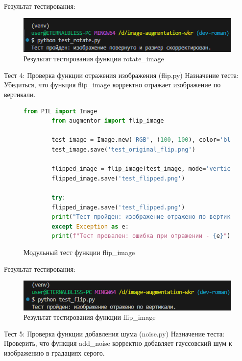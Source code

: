 Результат тестирования:
\begin{figure}[H]
	\centering
	\includegraphics[width=0.7\linewidth]{images/resulttest3}
	\caption{Результат тестирования функции rotate\_image}
	\label{fig:resulttest3}
\end{figure}

Тест 4: Проверка функции отражения изображения (flip.py)
Назначение теста: Убедиться, что функция flip\_image корректно отражает изображение по вертикали.

\begin{figure}[H]
	\begin{lstlisting}[language=Python]
		from PIL import Image
		from augmentor import flip_image
		
		test_image = Image.new('RGB', (100, 100), color='black')
		test_image.save('test_original_flip.png')
		
		flipped_image = flip_image(test_image, mode='vertical')
		flipped_image.save('test_flipped.png')
		
		try:
		flipped_image.save('test_flipped.png')
		print("Тест пройден: изображение отражено по вертикали.")
		except Exception as e:
		print(f"Тест провален: ошибка при отражении - {e}")
	\end{lstlisting}  
	\caption{Модульный тест функции flip\_image}
	\label{model_test:test4}
\end{figure}

Результат тестирования:
\begin{figure}[H]
	\centering
	\includegraphics[width=0.7\linewidth]{images/resulttest4}
	\caption{Результат тестирования функции flip\_image}
	\label{fig:resulttest4}
\end{figure}

Тест 5: Проверка функции добавления шума (noise.py)
Назначение теста: Проверить, что функция add\_noise корректно добавляет гауссовский шум к изображению в градациях серого.

